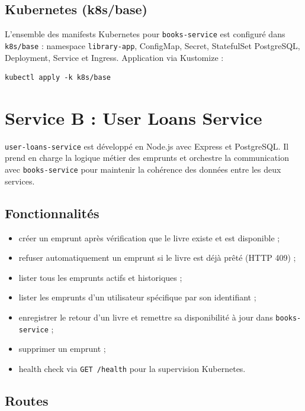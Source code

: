 \documentclass[12pt,a4paper]{article}
\begin{document}
\subsection{Kubernetes (k8s/base)}

L'ensemble des manifests Kubernetes pour \texttt{books-service} est configuré dans \texttt{k8s/base} :
namespace \texttt{library-app}, ConfigMap, Secret, StatefulSet PostgreSQL,
Deployment, Service et Ingress. Application via Kustomize :

\begin{Verbatim}[breaklines=true,breakanywhere=true]
kubectl apply -k k8s/base
\end{Verbatim}

\section{Service B : User Loans Service}

\texttt{user-loans-service} est développé en Node.js avec Express et PostgreSQL.
Il prend en charge la logique métier des emprunts et orchestre la communication avec \texttt{books-service}
pour maintenir la cohérence des données entre les deux services.

\subsection{Fonctionnalités}

\begin{itemize}[leftmargin=*]
  \item créer un emprunt après vérification que le livre existe et est disponible ;
  \item refuser automatiquement un emprunt si le livre est déjà prêté (HTTP 409) ;
  \item lister tous les emprunts actifs et historiques ;
  \item lister les emprunts d'un utilisateur spécifique par son identifiant ;
  \item enregistrer le retour d'un livre et remettre sa disponibilité à jour dans \texttt{books-service} ;
  \item supprimer un emprunt ;
  \item health check via \texttt{GET /health} pour la supervision Kubernetes.
\end{itemize}

\subsection{Routes}
\end{document}
